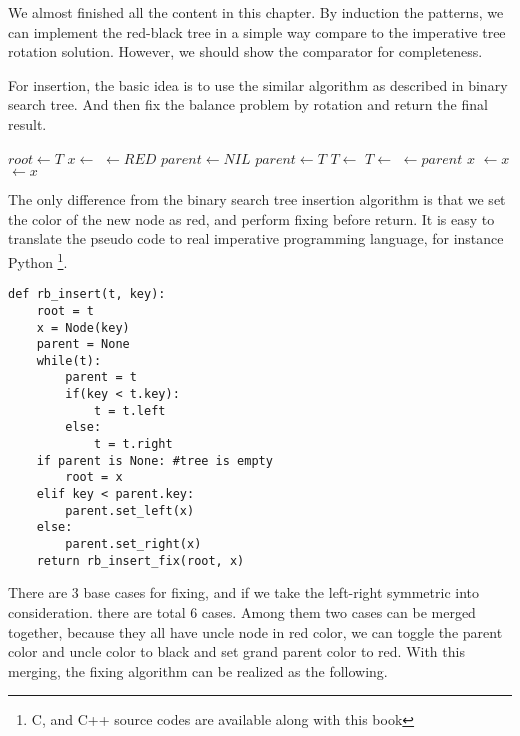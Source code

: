 \documentclass{article}
\begin{document}
We almost finished all the content in this chapter. By induction
the patterns, we can implement the red-black tree in a simple way
compare to the imperative tree rotation solution. However, we 
should show the comparator for completeness.

For insertion, the basic idea is to use the similar algorithm
as described in binary search tree. And then fix the balance
problem by rotation and return the final result.

\begin{algorithmic}[1]
  \State $root \gets T$
  \State $x \gets$ 
  \State {} $\gets RED$
  \State $parent \gets NIL$
    \State $parent \gets T$
      \State $T \gets $ 
    \Else
      \State $T \gets $ 
    \EndIf
  \EndWhile
  \State {} $\gets parent$
   
    \State \Return $x$
    \State {} $\gets x$
  \Else
    \State {} $\gets x$
  \EndIf
  \State \Return {}
\EndFunction
\end{algorithmic}

The only difference from the binary search tree insertion algorithm
is that we set the color of the new node as red, and perform fixing
before return. It is easy to translate the pseudo code to real 
imperative programming language, for instance Python \footnote{C, 
and C++ source codes are available along with this book}.

\lstset{language=Python}
\begin{lstlisting}
def rb_insert(t, key): 
    root = t
    x = Node(key)
    parent = None
    while(t):
        parent = t
        if(key < t.key):
            t = t.left
        else:
            t = t.right
    if parent is None: #tree is empty
        root = x
    elif key < parent.key:
        parent.set_left(x)
    else:
        parent.set_right(x)
    return rb_insert_fix(root, x)
\end{lstlisting}

There are 3 base cases for fixing, and if we take the left-right 
symmetric into consideration. there are total 6 cases. 
Among them two cases can be merged together, because they all have 
uncle node in red color, we can toggle the parent color and 
uncle color to black and set grand parent color to red. 
With this merging, the fixing algorithm can be realized as the following.
\end{document}
